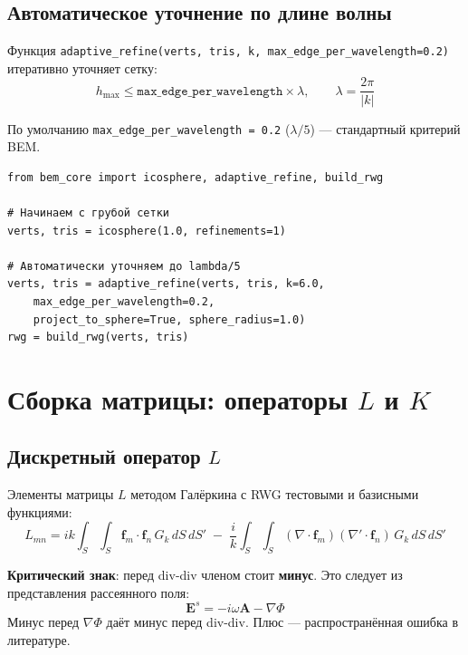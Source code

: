 \documentclass[12pt,a4paper]{article}
\begin{document}
\subsection{Автоматическое уточнение по длине волны}

Функция \texttt{adaptive\_refine(verts, tris, k, max\_edge\_per\_wavelength=0.2)} итеративно уточняет сетку:
\begin{equation}
  h_{\max} \leq \texttt{max\_edge\_per\_wavelength} \times \lambda, \qquad \lambda = \frac{2\pi}{|k|}
\end{equation}

По умолчанию \texttt{max\_edge\_per\_wavelength = 0.2} ($\lambda/5$) --- стандартный критерий BEM.

\begin{lstlisting}
from bem_core import icosphere, adaptive_refine, build_rwg

# Начинаем с грубой сетки
verts, tris = icosphere(1.0, refinements=1)

# Автоматически уточняем до lambda/5
verts, tris = adaptive_refine(verts, tris, k=6.0,
    max_edge_per_wavelength=0.2,
    project_to_sphere=True, sphere_radius=1.0)
rwg = build_rwg(verts, tris)
\end{lstlisting}


\section{Сборка матрицы: операторы $L$ и $K$}

\subsection{Дискретный оператор $L$}

Элементы матрицы $L$ методом Галёркина с RWG тестовыми и базисными функциями:
\begin{equation}
\boxed{
  L_{mn} = ik \int_S \int_S \mathbf{f}_m \cdot \mathbf{f}_n \, G_k \, dS\,dS'
  \;-\; \frac{i}{k} \int_S \int_S (\nabla\!\cdot\!\mathbf{f}_m)(\nabla'\!\cdot\!\mathbf{f}_n) \, G_k \, dS\,dS'
}
\end{equation}

\textbf{Критический знак}: перед div-div членом стоит \textbf{минус}. Это следует из представления рассеянного поля:
\begin{equation}
  \mathbf{E}^s = -i\omega\mathbf{A} - \nabla\Phi
\end{equation}
Минус перед $\nabla\Phi$ даёт минус перед div-div. Плюс --- распространённая ошибка в литературе.
\end{document}
